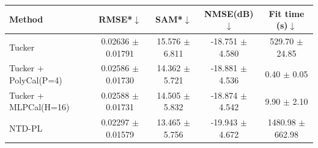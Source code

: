 \begin{tabular}{@{}l c c c c@{}}
\toprule
Method & RMSE*$\downarrow$ & SAM*$\downarrow$ & NMSE(dB)$\downarrow$ & Fit time (s)$\downarrow$\\
\midrule
Tucker & 0.02636 $\pm$ 0.01791 & 15.576 $\pm$ 6.811 & -18.751 $\pm$ 4.580 & 529.70 $\pm$ 24.85\\
Tucker + PolyCal(P=4) & 0.02586 $\pm$ 0.01730 & 14.362 $\pm$ 5.721 & -18.881 $\pm$ 4.536 & 0.40 $\pm$ 0.05\\
Tucker + MLPCal(H=16) & 0.02588 $\pm$ 0.01731 & 14.505 $\pm$ 5.832 & -18.874 $\pm$ 4.542 & 9.90 $\pm$ 2.10\\
NTD-PL & 0.02297 $\pm$ 0.01579 & 13.465 $\pm$ 5.756 & -19.943 $\pm$ 4.672 & 1480.98 $\pm$ 662.98\\
\bottomrule
\end{tabular}
